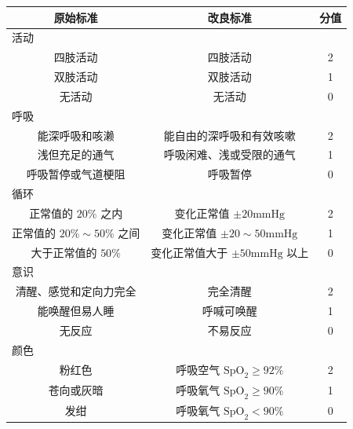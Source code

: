 \documentclass[10pt]{article}
\begin{document}
\begin{center}
\begin{tabular}{|c|c|c|}
\hline
原始标准 & 改良标准 & 分值 \\
\hline
\multicolumn{3}{|l|}{活动} \\
\hline
四肢活动 & 四肢活动 & 2 \\
\hline
双肢活动 & 双肢活动 & 1 \\
\hline
无活动 & 无活动 & 0 \\
\hline
\multicolumn{3}{|l|}{呼吸} \\
\hline
能深呼吸和咳濑 & 能自由的深呼吸和有效咳嗽 & 2 \\
\hline
浅但充足的通气 & 呼吸闲难、浅或受限的通气 & 1 \\
\hline
呼吸暂停或气道梗阻 & 呼吸暂停 & 0 \\
\hline
\multicolumn{3}{|l|}{循环} \\
\hline
正常值的 $20 \%$ 之内 & 变化正常值 $\pm 20 \mathrm{mmHg}$ & 2 \\
\hline
正常值的 $20 \% \sim 50 \%$ 之间 & 变化正常值 $\pm 20 \sim 50 \mathrm{mmHg}$ & 1 \\
\hline
大于正常值的 $50 \%$ & 变化正常值大于 $\pm 50 \mathrm{mmHg}$ 以上 & 0 \\
\hline
\multicolumn{3}{|l|}{意识} \\
\hline
清醒、感觉和定向力完全 & 完全清醒 & 2 \\
\hline
能唤醒但易人睡 & 呼喊可唤醒 & 1 \\
\hline
无反应 & 不易反应 & 0 \\
\hline
\multicolumn{3}{|l|}{颜色} \\
\hline
粉红色 & 呼吸空气 $\mathrm{SpO}_{2} \geqslant 92 \%$ & 2 \\
\hline
苍向或灰暗 & 呼吸氧气 $\mathrm{SpO}_{2} \geqslant 90 \%$ & 1 \\
\hline
发绀 & 呼吸氧气 $\mathrm{SpO}_{2}<90 \%$ & 0 \\
\hline
\end{tabular}
\end{center}
\end{document}
